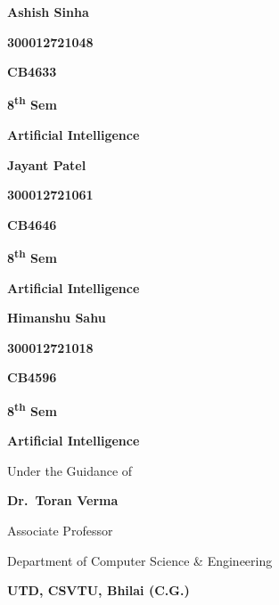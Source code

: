\begin{titlepage}
  \begin{minipage}{0.33\textwidth}
    \centering
    \textbf{Ashish Sinha}\par
    \textbf{300012721048}\par 
    \textbf{CB4633}\par
    \textbf{8\textsuperscript{th} Sem}\par
    \textbf{Artificial Intelligence}\par
  \end{minipage}%
  \begin{minipage}{0.33\textwidth}
    \centering
    \textbf{Jayant Patel}\par
    \textbf{300012721061}\par 
    \textbf{CB4646}\par
    \textbf{8\textsuperscript{th} Sem}\par
    \textbf{Artificial Intelligence}\par
  \end{minipage}%
  \begin{minipage}{0.33\textwidth}
    \centering
    \textbf{Himanshu Sahu}\par
    \textbf{300012721018}\par 
    \textbf{CB4596}\par
    \textbf{8\textsuperscript{th} Sem}\par
    \textbf{Artificial Intelligence}\par
  \end{minipage}
  
  \vspace{0.5cm}
  
  Under the Guidance of\par
  \textbf{Dr.\ Toran Verma}\par
  Associate Professor\par 
  Department of Computer Science \& Engineering\par
  \textbf{UTD, CSVTU, Bhilai (C.G.)}\par
  
  \vspace{0.3cm}
  

\end{titlepage}
